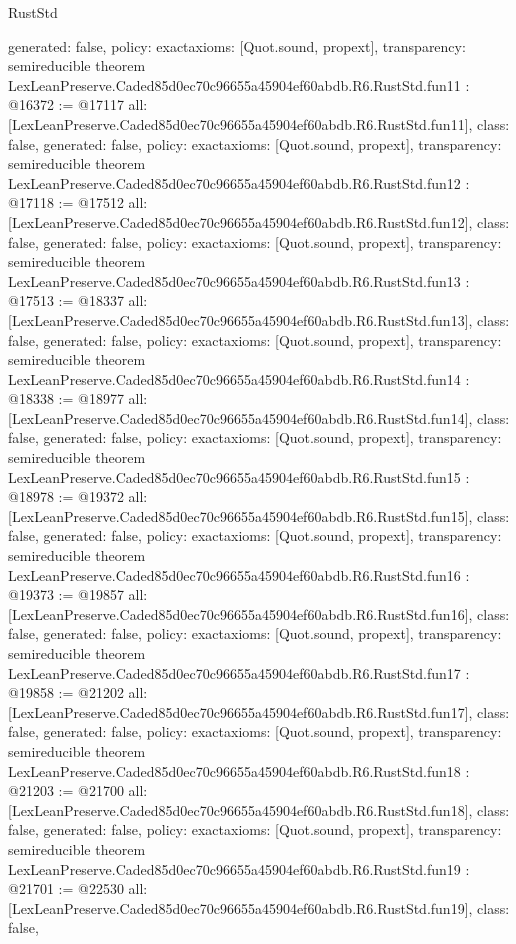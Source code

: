\begin{lexlean}{RustStd}
\begin{coremodule}
{  generated: false,
  policy: exact{axioms: [Quot.sound, propext]},
  transparency: semireducible
}
theorem LexLeanPreserve.Caded85d0ec70c96655a45904ef60abdb.R6.RustStd.fun11 : @16372 := @17117 {
  all: [LexLeanPreserve.Caded85d0ec70c96655a45904ef60abdb.R6.RustStd.fun11],
  class: false,
  generated: false,
  policy: exact{axioms: [Quot.sound, propext]},
  transparency: semireducible
}
theorem LexLeanPreserve.Caded85d0ec70c96655a45904ef60abdb.R6.RustStd.fun12 : @17118 := @17512 {
  all: [LexLeanPreserve.Caded85d0ec70c96655a45904ef60abdb.R6.RustStd.fun12],
  class: false,
  generated: false,
  policy: exact{axioms: [Quot.sound, propext]},
  transparency: semireducible
}
theorem LexLeanPreserve.Caded85d0ec70c96655a45904ef60abdb.R6.RustStd.fun13 : @17513 := @18337 {
  all: [LexLeanPreserve.Caded85d0ec70c96655a45904ef60abdb.R6.RustStd.fun13],
  class: false,
  generated: false,
  policy: exact{axioms: [Quot.sound, propext]},
  transparency: semireducible
}
theorem LexLeanPreserve.Caded85d0ec70c96655a45904ef60abdb.R6.RustStd.fun14 : @18338 := @18977 {
  all: [LexLeanPreserve.Caded85d0ec70c96655a45904ef60abdb.R6.RustStd.fun14],
  class: false,
  generated: false,
  policy: exact{axioms: [Quot.sound, propext]},
  transparency: semireducible
}
theorem LexLeanPreserve.Caded85d0ec70c96655a45904ef60abdb.R6.RustStd.fun15 : @18978 := @19372 {
  all: [LexLeanPreserve.Caded85d0ec70c96655a45904ef60abdb.R6.RustStd.fun15],
  class: false,
  generated: false,
  policy: exact{axioms: [Quot.sound, propext]},
  transparency: semireducible
}
theorem LexLeanPreserve.Caded85d0ec70c96655a45904ef60abdb.R6.RustStd.fun16 : @19373 := @19857 {
  all: [LexLeanPreserve.Caded85d0ec70c96655a45904ef60abdb.R6.RustStd.fun16],
  class: false,
  generated: false,
  policy: exact{axioms: [Quot.sound, propext]},
  transparency: semireducible
}
theorem LexLeanPreserve.Caded85d0ec70c96655a45904ef60abdb.R6.RustStd.fun17 : @19858 := @21202 {
  all: [LexLeanPreserve.Caded85d0ec70c96655a45904ef60abdb.R6.RustStd.fun17],
  class: false,
  generated: false,
  policy: exact{axioms: [Quot.sound, propext]},
  transparency: semireducible
}
theorem LexLeanPreserve.Caded85d0ec70c96655a45904ef60abdb.R6.RustStd.fun18 : @21203 := @21700 {
  all: [LexLeanPreserve.Caded85d0ec70c96655a45904ef60abdb.R6.RustStd.fun18],
  class: false,
  generated: false,
  policy: exact{axioms: [Quot.sound, propext]},
  transparency: semireducible
}
theorem LexLeanPreserve.Caded85d0ec70c96655a45904ef60abdb.R6.RustStd.fun19 : @21701 := @22530 {
  all: [LexLeanPreserve.Caded85d0ec70c96655a45904ef60abdb.R6.RustStd.fun19],
  class: false,
}
\end{coremodule}
\end{lexlean}
